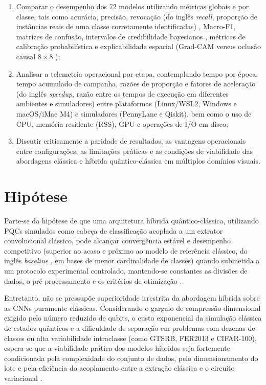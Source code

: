 \documentclass[
    12pt,
    openright,
    oneside,
    a4paper,
    english,
    brazil
]{abntex2}
\begin{document}
\begin{enumerate}
    \item Comparar o desempenho dos 72 modelos utilizando métricas globais e por classe, tais como acurácia, precisão, revocação (do inglês \textit{recall}, proporção de instâncias reais de uma classe corretamente identificadas) \cite{sokolova2009systematic,fawcett2006roc}, Macro-F1, matrizes de confusão, intervalos de credibilidade bayesianos \cite{wang2019bayestest}, métricas de calibração probabilística \cite{guo2017calibration} e explicabilidade espacial (Grad-CAM \cite{selvaraju2020gradcam} versus oclusão causal \(8 \times 8\) \cite{zeiler2014visualizing});
    \item Analisar a telemetria operacional por etapa, contemplando tempo por época, tempo acumulado de campanha, razões de proporção e fatores de aceleração (do inglês \textit{speedup}, razão entre os tempos de execução em diferentes ambientes e simuladores) \cite{faj2023warpspeed,chen2024quantumhpcworkflow} entre plataformas (Linux/WSL2, Windows e macOS/iMac M4) e simuladores (PennyLane e Qiskit), bem como o uso de CPU, memória residente (RSS), GPU e operações de I/O em disco;
    \item Discutir criticamente a paridade de resultados, as vantagens operacionais entre configurações, as limitações práticas e as condições de viabilidade das abordagens clássica e híbrida quântico-clássica em múltiplos domínios visuais.
\end{enumerate}

\section{Hipótese}

Parte-se da hipótese de que uma arquitetura híbrida quântico-clássica, utilizando PQCs simulados como cabeça de classificação acoplada a um extrator convolucional clássico, pode alcançar convergência estável e desempenho competitivo (superior ao acaso e próximo ao modelo de referência clássico, do inglês \textit{baseline} \cite{Wazlawick2020,LeCun2015}, em bases de menor cardinalidade de classes) quando submetida a um protocolo experimental controlado, mantendo-se constantes as divisões de dados, o pré-processamento e os critérios de otimização \cite{cerezo2021variational,bergholm2018pennylane}.

Entretanto, não se pressupõe superioridade irrestrita da abordagem híbrida sobre as CNNs puramente clássicas. Considerando o gargalo de compressão dimensional exigido pelo número reduzido de qubits, o custo exponencial da simulação clássica de estados quânticos e a dificuldade de separação em problemas com dezenas de classes ou alta variabilidade intraclasse (como GTSRB, FER2013 e CIFAR-100), espera-se que a viabilidade prática dos modelos híbridos seja fortemente condicionada pela complexidade do conjunto de dados, pelo dimensionamento do lote e pela eficiência do acoplamento entre a extração clássica e o circuito variacional \cite{mcclean2018barren,schuld2021effect}.
\end{document}
